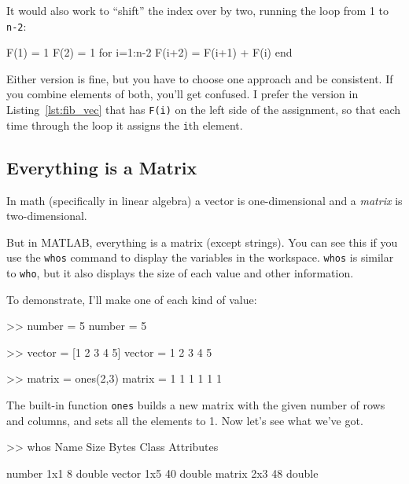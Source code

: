 It would also work to ``shift'' the index over by two, running the loop from 1 to {\tt n-2}:

\begin{code}
F(1) = 1
F(2) = 1
for i=1:n-2
    F(i+2) = F(i+1) + F(i)
end
\end{code}

Either version is fine, but you have to choose one approach
and be consistent.  If you combine elements of both, you'll
get confused.  I prefer the version in Listing~\ref{lst:fib_vec} that has {\tt F(i)} on the
left side of the assignment, so that each time through the loop
it assigns the {\tt i}th element.


\subsection{Everything is a Matrix}

In math (specifically in linear algebra) a vector is one-dimensional
and a \emph{matrix} is two-dimensional.


But in MATLAB, everything is a matrix (except strings).
You can see this if you use the {\tt whos} command to display the
variables in the workspace.  {\tt whos} is similar to {\tt who}, but it also displays the size of each value and other information.


To demonstrate, I'll make one of each kind of value:

\begin{code}
>> number = 5
number = 5

>> vector = [1 2 3 4 5]
vector = 1     2     3     4     5

>> matrix = ones(2,3)
matrix =
     1     1     1
     1     1     1
\end{code}

The built-in function {\tt ones} builds a new matrix with the given
number of rows and columns, and sets all the elements to 1.
Now let's see what we've got.


\begin{code}
>> whos
  Name        Size            Bytes  Class     Attributes

  number      1x1                 8  double              
  vector      1x5                40  double               
  matrix      2x3                48  double              
\end{code}

